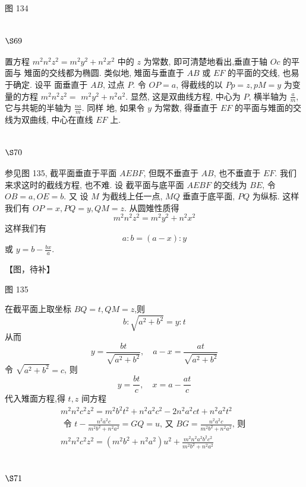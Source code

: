图 134

\section{$\S 69$}

置方程 $m^{2} n^{2} z^{2}=m^{2} y^{2}+n^{2} x^{2}$ 中的 $z$ 为常数, 即可清楚地看出,垂直于轴 $O c$ 的平面与 雉面的交线都为椭圆. 类似地, 雉面与垂直于 $A B$ 或 $E F$ 的平面的交线, 也易于确定. 设平 面垂直于 $A B$, 过点 $P$. 令 $O P=a$, 得截线的以 $P p=z, p M=y$ 为变量的方程 $m^{2} n^{2} z^{2}=$ $m^{2} y^{2}+n^{2} a^{2}$. 显然, 这是双曲线方程, 中心为 $P$, 横半轴为 $\frac{a}{m}$, 它与共轭的半轴为 $\frac{n a}{m}$. 同样 地, 如果令 $y$ 为常数, 得垂直于 $E F$ 的平面与雉面的交线为双曲线, 中心在直线 $E F$ 上.

\section{$\S 70$}

参见图 135, 截平面垂直于平面 $A E B F$, 但既不垂直于 $A B$, 也不垂直于 $E F$. 我们来求这时的截线方程, 也不难. 设 截平面与底平面 $A E B F$ 的交线为 $B E$, 令 $O B=a, O E=b$. 又 设 $M$ 为截线上任一点, $M Q$ 垂直于底平面, $P Q$ 为纵标. 这样 我们有 $O P=x, P Q=y, Q M=z$. 从圆雉性质得
\[
m^{2} n^{2} z^{2}=m^{2} y^{2}+n^{2} x^{2}
\]
这样我们有
\[
a: b=(a-x): y
\]
或 $y=b-\frac{b x}{a}$.


【图，待补】

图 135

在截平面上取坐标 $B Q=t, Q M=z$,则
\[
b: \sqrt{a^{2}+b^{2}}=y: t
\]
从而
\[
y=\frac{b t}{\sqrt{a^{2}+b^{2}}}, \quad a-x=\frac{a t}{\sqrt{a^{2}+b^{2}}}
\]
令 $\sqrt{a^{2}+b^{2}}=c$, 则 
\[
y=\frac{b t}{c}, \quad x=a-\frac{a t}{c}
\]
代入雉面方程,得 $t, z$ 间方程
\[
\begin{gathered}
m^{2} n^{2} c^{2} z^{2}=m^{2} b^{2} t^{2}+n^{2} a^{2} c^{2}-2 n^{2} a^{2} c t+n^{2} a^{2} t^{2} \\
\text { 令 } t-\frac{n^{2} a^{2} c}{m^{2} b^{2}+n^{2} a^{2}}=G Q=u \text {, 又 } B G=\frac{n^{2} a^{2} c}{m^{2} b^{2}+n^{2} a^{2}} \text {, 则 } \\
m^{2} n^{2} c^{2} z^{2}=\left(m^{2} b^{2}+n^{2} a^{2}\right) u^{2}+\frac{m^{2} n^{2} a^{2} b^{2} c^{2}}{m^{2} b^{2}+n^{2} a^{2}}
\end{gathered}
\]
\section{$\S 71$}

